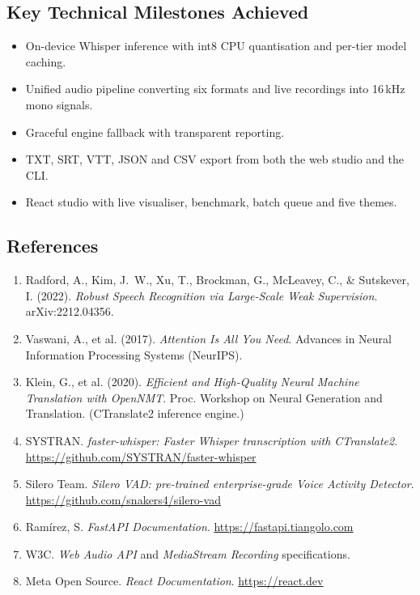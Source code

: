 \documentclass[11pt,a4paper]{article}
\begin{document}
\subsection*{Key Technical Milestones Achieved}
\begin{itemize}[leftmargin=1.2em,itemsep=1pt]
  \item[$\blacksquare$] On-device Whisper inference with int8 CPU quantisation and per-tier model caching.
  \item[$\blacksquare$] Unified audio pipeline converting six formats and live recordings into 16\,kHz mono signals.
  \item[$\blacksquare$] Graceful engine fallback with transparent reporting.
  \item[$\blacksquare$] TXT, SRT, VTT, JSON and CSV export from both the web studio and the CLI.
  \item[$\blacksquare$] React studio with live visualiser, benchmark, batch queue and five themes.
\end{itemize}

\subsection*{References}
\begin{enumerate}[leftmargin=1.5em,itemsep=2pt]
  \item Radford, A., Kim, J.~W., Xu, T., Brockman, G., McLeavey, C., \& Sutskever, I. (2022). \textit{Robust Speech Recognition via Large-Scale Weak Supervision}. arXiv:2212.04356.
  \item Vaswani, A., et al. (2017). \textit{Attention Is All You Need}. Advances in Neural Information Processing Systems (NeurIPS).
  \item Klein, G., et al. (2020). \textit{Efficient and High-Quality Neural Machine Translation with OpenNMT}. Proc. Workshop on Neural Generation and Translation. (CTranslate2 inference engine.)
  \item SYSTRAN. \textit{faster-whisper: Faster Whisper transcription with CTranslate2}. \url{https://github.com/SYSTRAN/faster-whisper}
  \item Silero Team. \textit{Silero VAD: pre-trained enterprise-grade Voice Activity Detector}. \url{https://github.com/snakers4/silero-vad}
  \item Ram\'irez, S. \textit{FastAPI Documentation}. \url{https://fastapi.tiangolo.com}
  \item W3C. \textit{Web Audio API} and \textit{MediaStream Recording} specifications.
  \item Meta Open Source. \textit{React Documentation}. \url{https://react.dev}
\end{enumerate}
\end{document}
